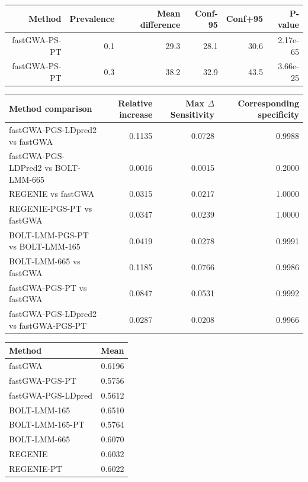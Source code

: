 \documentclass[10pt]{article}
\begin{document}
\begin{table}[!htb]
\centering
{}
\begin{tabular}{rrrrrr}
  \hline
 Method & Prevalence & Mean difference & Conf-95 & Conf+95 & P-value \\ 
  \hline
fastGWA-PS-PT & 0.1 & 29.3 & 28.1 & 30.6 & 2.17e-65 \\ 
fastGWA-PS-PT & 0.3 & 38.2 & 32.9 & 43.5 & 3.66e-25 \\ 
   \hline
\end{tabular}
\end{table}




\begin{table}[!htb]
\centering
{}
\begin{tabular}{lrrr}
  \hline
 Method comparison & Relative increase & Max $\Delta$Sensitivity & Corresponding specificity  \\ 
  \hline
fastGWA-PGS-LDpred2 vs fastGWA   & 0.1135 & 0.0728 & 0.9988 \\ 
fastGWA-PGS-LDPred2 vs BOLT-LMM-665   & 0.0016 & 0.0015 & 0.2000 \\ 
REGENIE vs fastGWA   & 0.0315 & 0.0217 & 1.0000 \\ 
REGENIE-PGS-PT vs fastGWA   & 0.0347 & 0.0239 & 1.0000 \\ 
BOLT-LMM-PGS-PT vs  BOLT-LMM-165   & 0.0419 & 0.0278 & 0.9991 \\ 
BOLT-LMM-665 vs  fastGWA   & 0.1185 & 0.0766 & 0.9986 \\ 
fastGWA-PGS-PT vs  fastGWA   & 0.0847 & 0.0531 & 0.9992 \\ 
fastGWA-PGS-LDpred2 vs  fastGWA-PGS-PT   & 0.0287 & 0.0208 & 0.9966 \\ 
   \hline
\end{tabular}
\end{table}

\begin{table}[!htb]
\centering
{} 
\label{tab:title}
\begin{tabular}{lr}
  \hline
 Method & Mean \\ 
  \hline
fastGWA & 0.6196 \\ 
  fastGWA-PGS-PT & 0.5756 \\ 
  fastGWA-PGS-LDpred & 0.5612 \\ 
  BOLT-LMM-165 & 0.6510 \\ 
  BOLT-LMM-165-PT & 0.5764 \\ 
  BOLT-LMM-665 & 0.6070 \\ 
  REGENIE & 0.6032 \\ 
  REGENIE-PT & 0.6022 \\ 
   \hline
\end{tabular}
\end{table}
\end{document}
